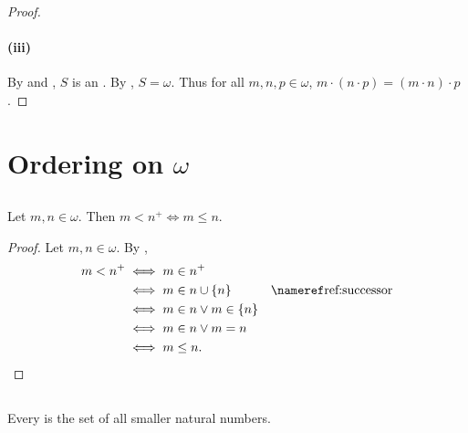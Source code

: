 \documentclass{report}
\begin{document}
\begin{proof}
    \paragraph{(iii)}%

      By  and , $S$
        is an .
      By , $S = \omega$.
      Thus for all $m, n, p \in \omega$,
        $m \cdot (n \cdot p) = (m \cdot n) \cdot p$.

  \end{proof}

\section{Ordering on \texorpdfstring{$\omega$}{Natural Numbers}}%

\subsection{}%

  \begin{lemma}
    Let $m, n \in \omega$.
    Then $m < n^+ \iff m \leq n$.
  \end{lemma}


  \begin{proof}
    Let $m, n \in \omega$.
    By ,
      \begin{align*}
        m < n^+
          & \iff m \in n^+ \\
          & \iff m \in n \cup \{n\} & \textref{ref:successor} \\
          & \iff m \in n \lor m \in \{n\} \\
          & \iff m \in n \lor m = n \\
          & \iff m \leq n.
      \end{align*}
  \end{proof}

\subsection{}%

  \begin{lemma}
    Every  is the set of all smaller natural
      numbers.
  \end{lemma}
\end{document}
